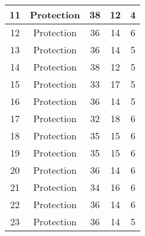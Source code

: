 \documentclass[results.tex]{subfiles}
\begin{document}
\begin{center}
\begin{tabular}{| c || c | c | c | c |}
            \hline
            11                      & Protection                   & 38                     & 12                      & 4                    \\
            \hline
            12                      & Protection                   & 36                     & 14                      & 6                    \\
            \hline
            13                      & Protection                   & 36                     & 14                      & 5                    \\
            \hline
            14                      & Protection                   & 38                     & 12                      & 5                    \\
            \hline
            15                      & Protection                   & 33                     & 17                      & 5                    \\
            \hline
            16                      & Protection                   & 36                     & 14                      & 5                    \\
            \hline
            17                      & Protection                   & 32                     & 18                      & 6                    \\
            \hline
            18                      & Protection                   & 35                     & 15                      & 6                    \\
            \hline
            19                      & Protection                   & 35                     & 15                      & 6                    \\
            \hline
            20                      & Protection                   & 36                     & 14                      & 6                    \\
            \hline
            21                      & Protection                   & 34                     & 16                      & 6                    \\
            \hline
            22                      & Protection                   & 36                     & 14                      & 6                    \\
            \hline
            23                      & Protection                   & 36                     & 14                      & 5                    \\

\end{tabular}
\end{center}
\end{document}
